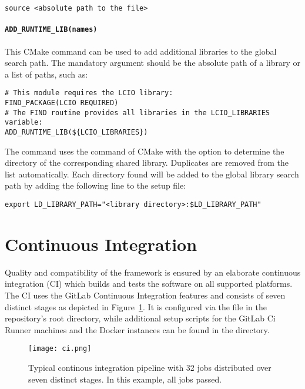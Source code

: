 \begin{verbatim}
source <absolute path to the file>
\end{verbatim}

\paragraph{\texttt{\textbf{ADD\_RUNTIME\_LIB(names)}}}

This CMake command can be used to add additional libraries to the global search path.
The mandatory argument  should be the absolute path of a library or a list of paths, such as:

\begin{verbatim}
# This module requires the LCIO library:
FIND_PACKAGE(LCIO REQUIRED)
# The FIND routine provides all libraries in the LCIO_LIBRARIES variable:
ADD_RUNTIME_LIB(${LCIO_LIBRARIES})
\end{verbatim}

The command uses the  command of CMake with the  option to determine the directory of the corresponding shared library.
Duplicates are removed from the list automatically.
Each directory found will be added to the global library search path by adding the following line to the setup file:

\begin{verbatim}
export LD_LIBRARY_PATH="<library directory>:$LD_LIBRARY_PATH"
\end{verbatim}

\section{Continuous Integration}
\label{sec:ci}

Quality and compatibility of the \apsq framework is ensured by an elaborate continuous integration (CI) which builds and tests the software on all supported platforms.
The \apsq CI uses the GitLab Continuous Integration features and consists of seven distinct stages as depicted in Figure~\ref{fig:ci}.
It is configured via the  file in the repository's root directory, while additional setup scripts for the GitLab Ci Runner machines and the Docker instances can be found in the  directory.

\begin{figure}[btp]
  \centering
  \texttt{[image: ci.png]}
  \caption{Typical \apsq continous integration pipeline with 32 jobs distributed over seven distinct stages. In this example, all jobs passed.}
  \label{fig:ci}
\end{figure}

